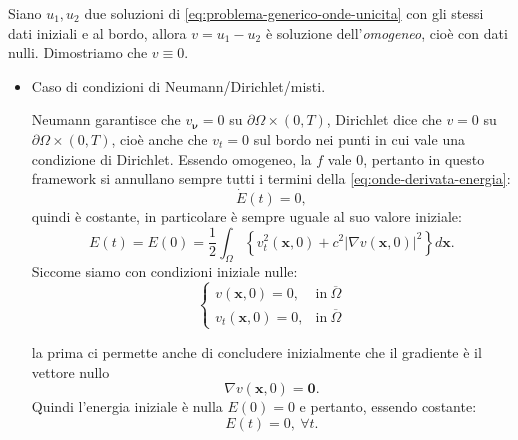 \documentclass[10pt,a4paper,twoside,openright]{book}
\newcommand{\x}{\mathbf{x}}
\begin{document}
\begin{dimostrazione}
	Siano $u_{1} ,u_{2}$ due soluzioni di \eqref{eq:problema-generico-onde-unicita} con gli stessi dati iniziali e al bordo, allora $v=u_{1} -u_{2}$ è soluzione dell'\textit{omogeneo}, cioè con dati nulli. Dimostriamo che $v\equiv 0$.
	\begin{itemize}
		\item Caso di condizioni di Neumann/Dirichlet/misti.
		      
		      Neumann garantisce che $v_{\bm{\nu }} =0$ su $\partial \Omega \times ( 0,T)$, Dirichlet dice che $v=0$ su $\partial \Omega \times ( 0,T)$, cioè anche che $v_{t} =0$ sul bordo nei punti in cui vale una condizione di Dirichlet. Essendo omogeneo, la $f$ vale $0$, pertanto in questo framework si annullano sempre tutti i termini della \eqref{eq:onde-derivata-energia}:
		      \begin{equation*}
		      	\dot{E}( t) =0,
		      \end{equation*}quindi è costante, in particolare è sempre uguale al suo valore iniziale:
		      \begin{equation*}
		      	E( t) =E( 0) =\frac{1}{2}\int _{\Omega }\left\{v_{t}^{2}(\x ,0) +c^{2}| \nabla v(\x ,0)| ^{2}\right\} d\x .
		      \end{equation*}Siccome siamo con condizioni iniziale nulle:
		      \begin{equation*}
		      	\begin{cases}
		      		v(\x ,0) =0,     & \text{in} \ \overline{\Omega } \\
		      		v_{t}(\x ,0) =0, & \text{in} \ \overline{\Omega } 
		      	\end{cases}
		      \end{equation*}
		      
		      la prima ci permette anche di concludere inizialmente che il gradiente è il vettore nullo\begin{equation*}
		      \nabla v(\x ,0) =\mathbf{0} .
		\end{equation*}Quindi l'energia iniziale è nulla $E( 0) =0$ e pertanto, essendo costante:
		\begin{equation*}
			E( t) =0,\ \forall t.
		\end{equation*}
		

\end{itemize}
\end{dimostrazione}
\end{document}
